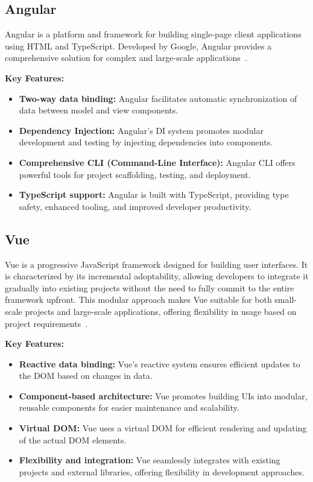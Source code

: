 \subsection{Angular}

Angular is a platform and framework for building single-page client applications using HTML and TypeScript. Developed by Google, Angular provides a comprehensive solution for complex and large-scale applications~\cite{angular-io}.

\textbf{Key Features:}
\begin{itemize}[label=\textbullet]
    \item \textbf{Two-way data binding:} Angular facilitates automatic synchronization of data between model and view components.
    \item \textbf{Dependency Injection:} Angular's DI system promotes modular development and testing by injecting dependencies into components.
    \item \textbf{Comprehensive CLI (Command-Line Interface):} Angular CLI offers powerful tools for project scaffolding, testing, and deployment.
    \item \textbf{TypeScript support:} Angular is built with TypeScript, providing type safety, enhanced tooling, and improved developer productivity.
\end{itemize}

\subsection{Vue}

Vue is a progressive JavaScript framework designed for building user interfaces. It is characterized by its incremental adoptability, allowing developers to integrate it gradually into existing projects without the need to fully commit to the entire framework upfront. This modular approach makes Vue suitable for both small-scale projects and large-scale applications, offering flexibility in usage based on project requirements~\cite{vuejs2024}.

\textbf{Key Features:}
\begin{itemize}[label=\textbullet]
    \item \textbf{Reactive data binding:} Vue's reactive system ensures efficient updates to the DOM based on changes in data.
    \item \textbf{Component-based architecture:} Vue promotes building UIs into modular, reusable components for easier maintenance and scalability.
    \item \textbf{Virtual DOM:} Vue uses a virtual DOM for efficient rendering and updating of the actual DOM elements.
    \item \textbf{Flexibility and integration:} Vue seamlessly integrates with existing projects and external libraries, offering flexibility in development approaches.
\end{itemize}

